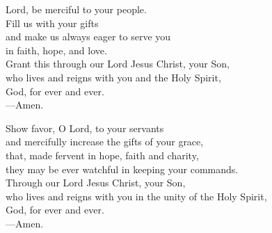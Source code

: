 \prayer


\begin{prayerverse}
Lord, be merciful to your people.\\
Fill us with your gifts\\
and make us always eager to serve you\\
in faith, hope, and love.\\
Grant this through our Lord Jesus Christ, your Son,\\
who lives and reigns with you and the Holy Spirit,\\
God, for ever and ever.\\
{\color{red}---\thinspace}Amen.
\end{prayerverse}


\begin{prayerverse}
Show favor, O Lord, to your servants\\
and mercifully increase the gifts of your grace,\\
that, made fervent in hope, faith and charity,\\
they may be ever watchful in keeping your commands.\\
Through our Lord Jesus Christ, your Son,\\
who lives and reigns with you in the unity of the Holy Spirit,\\
God, for ever and ever.\\
{\color{red}---\thinspace}Amen.
\end{prayerverse}

